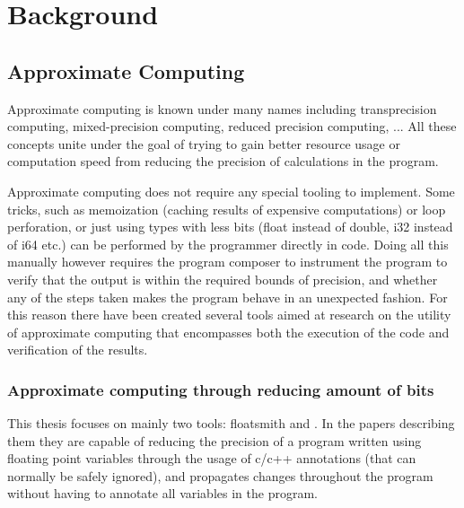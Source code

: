 \section{Background} 

\subsection{Approximate Computing}
Approximate computing is known under many names including transprecision computing, mixed-precision computing, reduced precision computing, ...
All these concepts unite under the goal of trying to gain better resource usage or computation speed from reducing the precision of calculations in the program. 

Approximate computing does not require any special tooling to implement. Some tricks, such as memoization (caching results of expensive computations) or loop perforation, or just using types with less bits (float instead of double, i32 instead of i64 etc.) can be performed by the programmer directly in code. Doing all this manually however requires the program composer to instrument the program to verify that the output is within the required bounds of precision, and whether any of the steps taken makes the program behave in an unexpected fashion. For this reason there have been created several tools aimed at research on the utility of approximate computing that encompasses both the execution of the code and verification of the results. 

\subsubsection{Approximate computing through reducing amount of bits}

This thesis focuses on mainly two tools: floatsmith and \taffo. In the papers describing them they are capable of reducing the precision of a program written using floating point variables through the usage of c/c++ annotations (that can normally be safely ignored), and propagates changes throughout the program without having to annotate all variables in the program.

